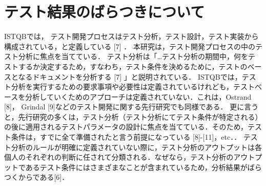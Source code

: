 \documentclass[a4paper,11pt]{jreport}
\begin{document}
\section{テスト結果のばらつきについて}

ISTQBでは， テスト開発プロセスはテスト分析，テスト設計，テスト実装から構成されている，と定義している [7] ．
本研究は，テスト開発プロセスの中のテスト分析に焦点を当てている．
テスト分析は「…テスト分析の期間中，何をテストするか決定するため，すなわち，テスト条件を決めるために，テストのベースとなるドキュメントを分析する [7] 」と説明されている．
ISTQBでは，テスト分析を実行するための要求事項や必要性は定義されているけれども，テストベースを分析していくためのアプローチは定義されていない．これは，Ostrand [8]， Grindal [9]などのテスト開発に関する先行研究でも同様である．
更に言うと，先行研究の多くは，テスト分析（テスト分析にてテスト条件が特定される）の後に適用されるテストパラメータの設計に焦点を当てている．そのため，テスト条件は，すでに全て準備されたと言う前提になっている [8]-[11]，etc．．
テスト分析のルールが明確に定義されていない際に，テスト分析のアウトプットは各個人のそれぞれの判断に任されて分類される．なぜなら，テスト分析のアウトプットであるテスト条件にはさまざまなことが含まれているため，分析結果がばらつくからである[6]．
\end{document}
